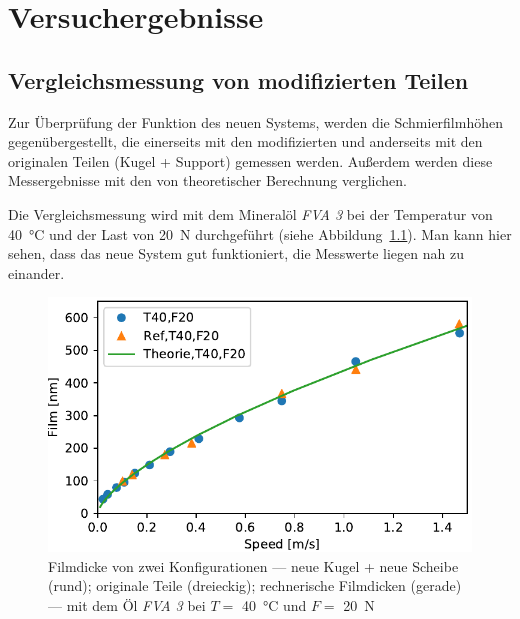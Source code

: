 \chapter{Versuchergebnisse}
\label{chap:versuchergenisse}

\section{Vergleichsmessung von modifizierten Teilen}
\label{sec:vergleichsmessung_von_difizierten_Teilen}

Zur Überprüfung der Funktion des neuen Systems, werden die Schmierfilmhöhen gegenübergestellt, die einerseits mit den modifizierten und anderseits mit den originalen Teilen (Kugel + Support) gemessen werden.
Außerdem werden diese Messergebnisse mit den von theoretischer Berechnung verglichen.

Die Vergleichsmessung wird mit dem Mineralöl \textit{FVA 3} bei der Temperatur von \SI{40}{\degreeCelsius} und der Last von \SI{20}{\N} durchgeführt (siehe Abbildung~\ref{fig:vergleichsmessung}).
Man kann hier sehen, dass das neue System gut funktioniert, die Messwerte liegen nah zu einander.

\begin{figure}[htb]
    \centering
    \includegraphics[]{./images/vergleichsmessung_T40_F20_FVA3.pdf}
    \caption{Filmdicke von zwei Konfigurationen --- neue Kugel + neue Scheibe (rund); originale Teile (dreieckig); rechnerische Filmdicken (gerade) --- mit dem Öl \textit{FVA 3} bei $T =$ \SI{40}{\degreeCelsius} und $F =$ \SI{20}{\N}}
    \label{fig:vergleichsmessung}
\end{figure}

